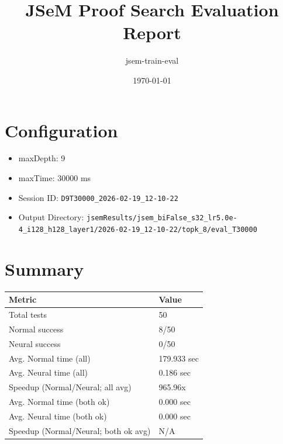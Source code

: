 \documentclass[a4paper,10pt]{article}
\title{JSeM Proof Search Evaluation Report}
\author{jsem-train-eval}
\date{\today}
\begin{document}
\maketitle

\section{Configuration}
\begin{itemize}
\item maxDepth: 9
\item maxTime: 30000 ms
\item Session ID: \texttt{D9T30000\_2026-02-19\_12-10-22}
\item Output Directory: \texttt{jsemResults/jsem\_biFalse\_s32\_lr5.0e-4\_i128\_h128\_layer1/2026-02-19\_12-10-22/topk\_8/eval\_T30000}
\end{itemize}

\section{Summary}
\begin{tabular}{ll}
\toprule
\textbf{Metric} & \textbf{Value} \\
\midrule
Total tests & 50 \\
Normal success & 8/50 \\
Neural success & 0/50 \\
\midrule
Avg. Normal time (all) & 179.933 sec \\
Avg. Neural time (all) & 0.186 sec \\
Speedup (Normal/Neural; all avg) & 965.96x \\
Avg. Normal time (both ok) & 0.000 sec \\
Avg. Neural time (both ok) & 0.000 sec \\
Speedup (Normal/Neural; both ok avg) & N/A \\
\bottomrule
\end{tabular}
\end{document}
